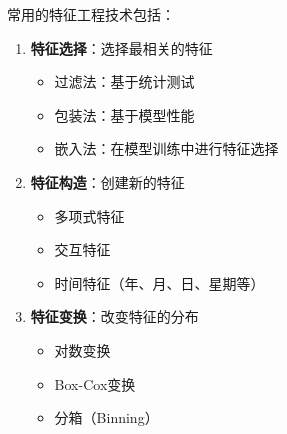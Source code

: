 \begin{example}[特征工程技术]
    常用的特征工程技术包括：
    \begin{enumerate}
        \item \textbf{特征选择}：选择最相关的特征
              \begin{itemize}
                  \item 过滤法：基于统计测试
                  \item 包装法：基于模型性能
                  \item 嵌入法：在模型训练中进行特征选择
              \end{itemize}
        \item \textbf{特征构造}：创建新的特征
              \begin{itemize}
                  \item 多项式特征
                  \item 交互特征
                  \item 时间特征（年、月、日、星期等）
              \end{itemize}
        \item \textbf{特征变换}：改变特征的分布
              \begin{itemize}
                  \item 对数变换
                  \item Box-Cox变换
                  \item 分箱（Binning）
              \end{itemize}
    \end{enumerate}
\end{example}
